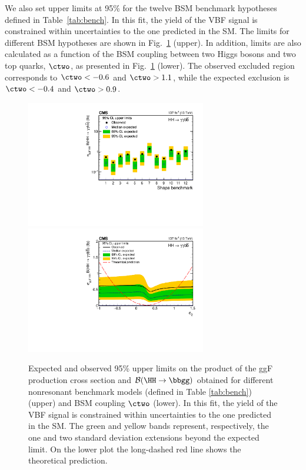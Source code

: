 \documentclass[11pt,a4paper,cmspaper,final,collab]{cms-tdr}
\begin{document}
We also set upper limits at 95\% \CL for the twelve BSM benchmark hypotheses defined in Table~\ref{tab:bench}. In this fit, the yield of the VBF \HH signal is constrained within uncertainties to the one predicted in the SM. The limits for different BSM hypotheses are shown in Fig.~\ref{fig:klambdascan_bench} (upper). In addition, limits are also calculated as a function of the BSM coupling between two Higgs bosons and two top quarks, $\ctwo$, as presented in Fig.~\ref{fig:klambdascan_bench} (lower). The observed excluded region corresponds to $\ctwo < -0.6$ and $\ctwo > 1.1$, while the expected exclusion is $\ctwo < -0.4$ and $\ctwo > 0.9$.


\begin{figure}[!ht]
  \centering
\includegraphics[width=0.7\textwidth]{Figure_016-a.pdf}\hfil \\
\includegraphics[width=0.7\textwidth]{Figure_016-b.pdf}\hfil 
  \caption{Expected and observed 95\% \CL upper limits on the product of the ggF \HH production cross section and $\mathcal{B}(\HH\to\bbgg)$ obtained for different nonresonant benchmark models (defined in Table \ref{tab:bench}) (upper) and BSM coupling $\ctwo$ (lower). In this fit, the yield of the VBF \HH signal is constrained within uncertainties to the one predicted in the SM. The green and yellow bands represent, respectively, the one and two standard deviation extensions beyond the expected limit. On the lower plot the long-dashed red line shows the theoretical prediction.
}
  \label{fig:klambdascan_bench}
\end{figure}
\end{document}
